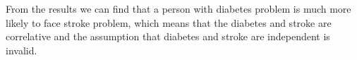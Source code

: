 \documentclass[aps,letterpaper,10pt]{revtex4}
\begin{document}
From the results we can find that a person with diabetes problem is much more likely to face stroke problem, which means that the diabetes and stroke are correlative and the assumption that diabetes and stroke are independent is invalid.

\end{document}
